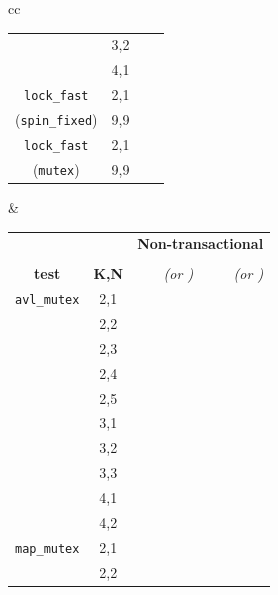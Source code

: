 \begin{table}[hb!]
\begin{center}
\begin{tabular}{cc}
\begin{tabular}{cc||r|r}
			& 3,2 & \ETAdag{26h 42m} & \ETAdag{1223955} \\
			& 4,1 & \cpu{665.89} & \ints{15064}	\\
			\hline
			{\tt lock\_fast}
			& 2,1 & \cpu{3.25} & \ints{1}	\\
			({\tt spin\_fixed})
			& 9,9 & \cpu{4.61} & \ints{1}	\\
			\hline
			{\tt lock\_fast}
			& 2,1 & \cpu{3.19} & \ints{1}	\\
			({\tt mutex})
			& 9,9 & \cpu{4.62} & \ints{1}	\\
			\end{tabular}
			&
		\footnotesize
			\begin{tabular}{cc||r|r}
			& & \multicolumn{2}{c}{\bf Non-transactional} \\
			& & \cpu{\bf cpu (s)} & \ints{\bf SS size} \\
			\bf test & \bf K,N & \em (or \ETAdag{\bf \em ETA}) & \em (or \ETAdag{\bf \em est.}) \\
			\hline
			\hline
			{\tt avl\_mutex}
			& 2,1 & \cpu{3.48} & \ints{7} \\
			& 2,2 & \cpu{6.25} & \ints{85} \\
			& 2,3 & \cpu{24.69} & \ints{561} \\
			& 2,4 & \cpu{217.98} & \ints{4984} \\
			& 2,5 & \cpu{3417.86} & \ints{76787} \\
			& 3,1 & \cpu{8.26} & \ints{129} \\
			& 3,2 & \cpu{1403.46} & \ints{30653} \\
			& 3,3 & \ETAdag{11d 22h} & \ETAdag{23136172} \\
			& 4,1 & \cpu{199.96} & \ints{4488} \\
			& 4,2 & \ETAdag{41d 0h} & \ETAdag{66520074} \\
			\cline{1-4}
			{\tt map\_mutex}
			& 2,1 & \cpu{39.81} & \ints{83} \\
			& 2,2 & \ETAdag{26h 21m} & \ETAdag{1085126} \\

\end{tabular}
\end{tabular}
\end{center}
\end{table}
